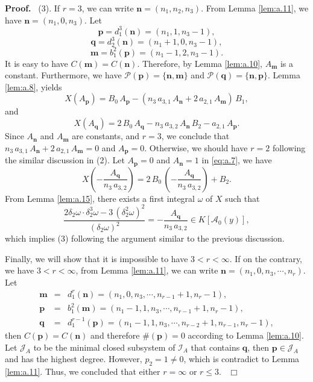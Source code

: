 \documentclass[preprint, 12pt]{elsarticle}
\numberwithin{equation}{section}
\newenvironment{proof}[1][Proof]{\textbf{#1.}\ }{\ $\Box$}
\newcommand{\A}{\mathcal{A}}
\begin{document}
\begin{proof}
(3). If $r = 3$, we can write $\mathbf{n} = (n_1,n_2,n_3)$. From Lemma
\ref{lem:a.11}, we have $\mathbf{n} = (n_1,0,n_3)$. Let
$$\mathbf{p} = d_1^3(\mathbf{n}) = (n_1,1,n_3-1),$$
$$ \mathbf{q} = d_2^3(\mathbf{n}) = (n_1+1,0,n_3-1),$$
$$ \mathbf{m} = {b_1^2}(\mathbf{p}) = (n_1-1,2,n_3-1).$$ It is easy to have
$C(\mathbf{m}) = C(\mathbf{n})$. Therefore, by Lemma
\ref{lem:a.10}, $A_{\mathbf{m}}$ is a constant. Furthermore, we
have $\mathcal{P}(\mathbf{p}) = \{\mathbf{n},\mathbf{m}\}$ and
$\mathcal{P}(\mathbf{q}) = \{\mathbf{n},\mathbf{p}\}$.  Lemma
\ref{lem:a.8}, yields
\begin{equation}
\label{eq:a.6} X(A_{\mathbf{p}}) = B_0\,A_{\mathbf{p}} -
(n_3\,a_{3,1}\,A_{\mathbf{n}} +
2\,a_{2,1}\,A_{\mathbf{m}})\,B_1,
\end{equation}
and
\begin{equation}
\label{eq:a.7} X(A_{\mathbf{q}}) 
= 2\,B_0\,A_{\mathbf{q}} -
n_3\, a_{3,2}\,A_{\mathbf{n}}\,B_2 - a_{2,1}\,A_{\mathbf{p}}.
\end{equation}
Since $A_\mathbf{n}$ and $A_\mathbf{m}$ are
constants, and $r=3$, we conclude that
$n_3\,a_{3,1}\,A_{\mathbf{n}} + 2\,a_{2,1}\,A_{\mathbf{m}} = 0$
and $A_{\mathbf{p}} = 0$. Otherwise, we should have $r = 2$ following the
similar discussion in (2). Let $A_{\mathbf{p}} =
0$ and $A_\mathbf{n} = 1$ in \eqref{eq:a.7}, we have
$$X(-\frac{A_{\mathbf{q}}}{n_3\,a_{3,2}}) = 2\,B_0\,(-\frac{A_\mathbf{q}}{n_3\,a_{3,2}}) + B_2.$$
From Lemma \ref{lem:a.15}, there exists a first integral $\omega$ of
$X$ such that
$$\dfrac{2\delta_2\omega\cdot\delta_2^3\omega-3\,(\delta_2^2\omega)^2}{(\delta_2\omega)^2} = -\frac{A_\mathbf{q}}{n_3\,a_{3,2}}\in K[\A_0(y)],$$
which implies (3) following the argument similar to the previous discussion.

Finally, we will show that it is impossible to have $3< r <\infty$. If on the contrary, we have $3 < r < \infty$, from Lemma
\ref{lem:a.11}, we can write $\mathbf{n} =
(n_1,0,n_3,\cdots,n_r)$. Let
\begin{eqnarray*}
\mathbf{m} &=& d_1^r(\mathbf{n}) =
(n_1,0,n_3,\cdots,n_{r-1}+1,n_r-1),\\
\mathbf{p} &=& {b_1^2}(\mathbf{m}) =
(n_1-1,1,n_3,\cdots,n_{r-1}+1,n_r-1),\\
\mathbf{q} &=& d_1^{r-1}(\mathbf{p}) =
(n_1-1,1,n_3,\cdots,n_{r-2}+1, n_{r-1},n_r-1),
\end{eqnarray*}
then $C(\mathbf{p}) = C(\mathbf{n})$ and therefore $\#(\mathbf{p})
= 0$ according to Lemma \ref{lem:a.10}. Let $\mathcal{J}_A$ to be the minimal closed
subsystem of $\mathcal{I}_A$ that contains $\mathbf{q}$, then $\mathbf{p}\in
\mathcal{J}_A$ and has the highest degree. However, $p_2 = 1\not=0$, which is
contradict to Lemma \ref{lem:a.11}. Thus, we concluded that either
$r = \infty$ or $r\leq 3$.
\end{proof}
\end{document}
